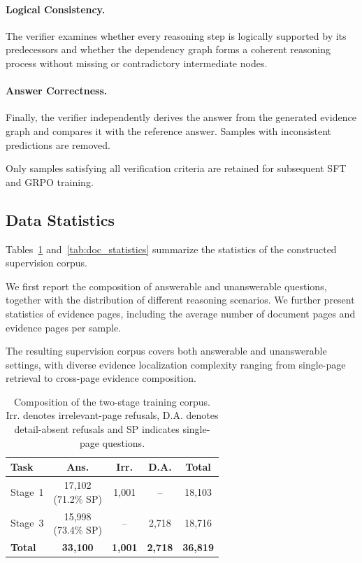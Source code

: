 \documentclass[letterpaper]{article} %
\begin{document}
\paragraph{Logical Consistency.}
The verifier examines whether every reasoning step is logically supported by its predecessors and whether the dependency graph forms a coherent reasoning process without missing or contradictory intermediate nodes.

\paragraph{Answer Correctness.}
Finally, the verifier independently derives the answer from the generated evidence graph and compares it with the reference answer. Samples with inconsistent predictions are removed.

Only samples satisfying all verification criteria are retained for subsequent SFT and GRPO training.



\subsection{Data Statistics}

Tables~\ref{tab:data_statistics} and~\ref{tab:doc_statistics} summarize the statistics of the constructed supervision corpus.

We first report the composition of answerable and unanswerable questions, together with the distribution of different reasoning scenarios. We further present statistics of evidence pages, including the average number of document pages and evidence pages per sample.

The resulting supervision corpus covers both answerable and unanswerable settings, with diverse evidence localization complexity ranging from single-page retrieval to cross-page evidence composition.


\begin{table}[h]
\centering
\begin{tabular}{lcccc}
\toprule
\textbf{Task}
& \textbf{Ans.}
& \textbf{Irr.}
& \textbf{D.A.}
& \textbf{Total} \\
\midrule

Stage~1
&
\makecell[c]{17,102\\[-1mm]
{\scriptsize(71.2\% SP)}}
&
1,001
&
--
&
18,103
\\

Stage~3
&
\makecell[c]{15,998\\[-1mm]
{\scriptsize(73.4\% SP)}}
&
--
&
2,718
&
18,716
\\

\midrule

\textbf{Total}
&
\textbf{33,100}
&
\textbf{1,001}
&
\textbf{2,718}
&
\textbf{36,819}
\\

\bottomrule
\end{tabular}

\caption{
Composition of the two-stage training corpus.
Irr. denotes irrelevant-page refusals, D.A. denotes detail-absent refusals and SP indicates single-page questions.
}
\label{tab:data_statistics}

\end{table}
\end{document}
